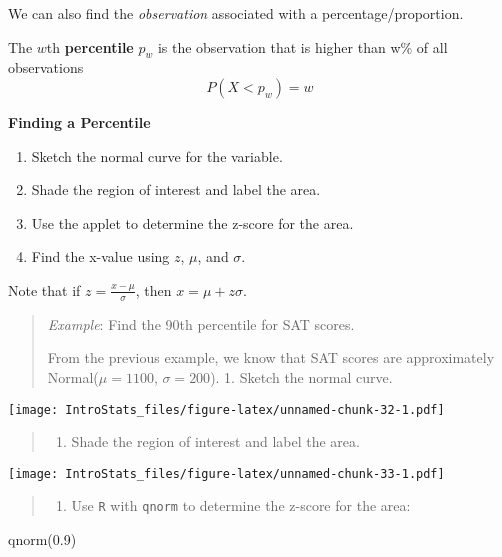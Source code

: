 \documentclass[
]{book}
\newenvironment{Shaded}{\begin{snugshade}}{\end{snugshade}}
\newcommand{\FloatTok}[1]{\textcolor[rgb]{0.00,0.00,0.81}{#1}}
\newcommand{\FunctionTok}[1]{\textcolor[rgb]{0.00,0.00,0.00}{#1}}
\newcommand{\NormalTok}[1]{#1}
\providecommand{\tightlist}{%
  \setlength{\itemsep}{0pt}\setlength{\parskip}{0pt}}
\begin{document}
We can also find the \emph{observation} associated with a percentage/proportion.

The \(w\)th \textbf{percentile} \(p_w\) is the observation that is higher than w\% of all observations \[P(X < p_w) = w\]

\textbf{Finding a Percentile}

\begin{enumerate}
\def\labelenumi{\arabic{enumi}.}
\tightlist
\item
  Sketch the normal curve for the variable.
\item
  Shade the region of interest and label the area.
\item
  Use the applet to determine the z-score for the area.
\item
  Find the x-value using \(z\), \(\mu\), and \(\sigma\).
\end{enumerate}

Note that if \(z = \frac{x-\mu}{\sigma}\), then \(x = \mu + z\sigma\).

\begin{quote}
\emph{Example}: Find the 90th percentile for SAT scores.

From the previous example, we know that SAT scores are approximately Normal(\(\mu=1100\), \(\sigma=200\)).
1. Sketch the normal curve.
\end{quote}

\texttt{[image: IntroStats\_files/figure-latex/unnamed-chunk-32-1.pdf]}

\begin{quote}
\begin{enumerate}
\def\labelenumi{\arabic{enumi}.}
\setcounter{enumi}{1}
\tightlist
\item
  Shade the region of interest and label the area.
\end{enumerate}
\end{quote}

\texttt{[image: IntroStats\_files/figure-latex/unnamed-chunk-33-1.pdf]}

\begin{quote}
\begin{enumerate}
\def\labelenumi{\arabic{enumi}.}
\setcounter{enumi}{2}
\tightlist
\item
  Use \texttt{R} with \texttt{qnorm} to determine the z-score for the area:
\end{enumerate}
\end{quote}

\begin{Shaded}
\begin{Highlighting}[]
\FunctionTok{qnorm}\NormalTok{(}\FloatTok{0.9}\NormalTok{)}
\end{Highlighting}
\end{Shaded}
\end{document}
